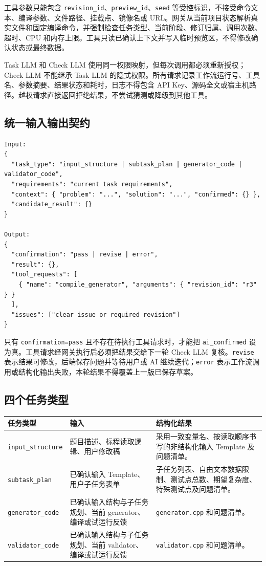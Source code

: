 \documentclass[UTF8,zihao=-4]{ctexart}
\begin{document}
工具参数只能包含 \texttt{revision\_id}、\texttt{preview\_id}、\texttt{seed} 等受控标识，不接受命令文本、编译参数、文件路径、挂载点、镜像名或 URL。网关从当前项目状态解析真实文件和固定编译命令，并强制检查任务类型、当前阶段、修订归属、调用次数、超时、CPU 和内存上限。工具只读已确认上下文并写入临时预览区，不得修改确认状态或最终数据。

Task LLM 和 Check LLM 使用同一权限映射，但每次调用都必须重新授权；Check LLM 不能继承 Task LLM 的隐式权限。所有请求记录工作流运行号、工具名、参数摘要、结果状态和耗时，日志不得包含 API Key、源码全文或宿主机路径。越权请求直接返回拒绝结果，不尝试猜测或降级到其他工具。

\subsection{统一输入输出契约}

\begin{lstlisting}
Input:
{
  "task_type": "input_structure | subtask_plan | generator_code | validator_code",
  "requirements": "current task requirements",
  "context": { "problem": "...", "solution": "...", "confirmed": {} },
  "candidate_result": {}
}

Output:
{
  "confirmation": "pass | revise | error",
  "result": {},
  "tool_requests": [
    { "name": "compile_generator", "arguments": { "revision_id": "r3" } }
  ],
  "issues": ["clear issue or required revision"]
}
\end{lstlisting}

只有 \texttt{confirmation=pass} 且不存在待执行工具请求时，才能把 \texttt{ai\_confirmed} 设为真。工具请求经网关执行后必须把结果交给下一轮 Check LLM 复核。\texttt{revise} 表示结果可修改，后端保存问题并等待用户或 AI 继续迭代；\texttt{error} 表示工作流调用或结构化输出失败，本轮结果不得覆盖上一版已保存草案。

\subsection{四个任务类型}

\begin{longtable}{p{3.2cm}p{4.8cm}p{5.9cm}}
\toprule
任务类型 & 输入 & 结构化结果 \\
\midrule
\footnotesize\texttt{input\_structure} & 题目描述、标程读取逻辑、用户修改稿 & 采用一致变量名、按读取顺序书写的非结构化输入 Template 及问题清单。 \\
\footnotesize\texttt{subtask\_plan} & 已确认输入 Template、用户子任务表单 & 子任务列表、自由文本数据限制、测试点总数、期望复杂度、特殊测试点及问题清单。 \\
\footnotesize\texttt{generator\_code} & 已确认输入结构与子任务规划、当前 generator、编译或试运行反馈 & \texttt{generator.cpp} 和问题清单。 \\
\footnotesize\texttt{validator\_code} & 已确认输入结构与子任务规划、当前 validator、编译或试运行反馈 & \texttt{validator.cpp} 和问题清单。 \\
\bottomrule
\end{longtable}
\end{document}
